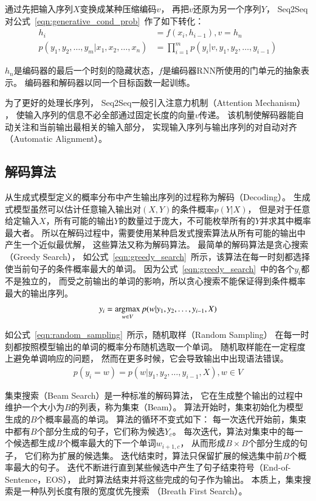 通过先把输入序列$X$变换成某种压缩编码$v$，
再把$v$还原为另一个序列$Y$，
Seq2Seq对公式~\ref{eqn:generative_cond_prob}~作了如下转化：
\begin{align}
    h_i &= f(x_i ,h_{i-1}), v = h_n \\
    p(y_1, y_2, \dots, y_m|x_1, x_2, \dots, x_n) &=
    \prod_{i=1}^m p(y_i|v, y_1, y_2, \dots, y_{i-1})
\end{align}

$h_n$是编码器的最后一个时刻的隐藏状态，$f$是编码器RNN所使用的门单元的抽象表示。
编码器和解码器以同一个目标函数一起训练。

为了更好的处理长序列，
Seq2Seq一般引入注意力机制（Attention Mechanism）
，
使输入序列的信息不必全部通过固定长度的向量$v$传递。
该机制使解码器能自动关注和当前输出最相关的输入部分，
实现输入序列与输出序列的对自动对齐（Automatic Alignment）。

\subsection{解码算法}\label{subsec:decode}
从生成式模型定义的概率分布中产生输出序列的过程称为解码（Decoding）。
生成式模型虽然可以估计任意输入输出对$(X, Y)$的条件概率$p(Y|X)$，
但是对于任意给定输入$X$，所有可能的输出$Y$的数量过于庞大，不可能枚举所有的$Y$并求其中概率最大者。
所以在解码过程中，需要使用某种启发式搜索算法从所有可能的输出中产生一个近似最优解，
这些算法又称为解码算法。
最简单的解码算法是贪心搜索（Greedy Search），
如公式~\ref{eqn:greedy_search}~所示，该算法在每一时刻都选择使当前句子的条件概率最大的单词。
因为公式~\ref{eqn:greedy_search}~中的各个$y_i$都不是独立的，
而受之前输出的单词的影响，所以贪心搜索不能保证得到条件概率最大的输出序列。
\begin{align}
    y_i = \operatorname*{argmax}_{w \in V} p(w|y_1, y_2, \dots, y_{i-1}, X)
    \label{eqn:greedy_search}
\end{align}

如公式~\ref{eqn:random_sampling}~所示，随机取样（Random Sampling）
在每一时刻都按照模型输出的单词的概率分布随机选取一个单词。
随机取样能在一定程度上避免单调响应的问题，
然而在更多时候，它会导致输出中出现语法错误。
\begin{align}
    p(y_i = w) = p(w|y_1, y_2, \dots, y_{i-1}, X), w \in V
    \label{eqn:random_sampling}
\end{align}

集束搜索（Beam Search）是一种标准的解码算法，
它在生成整个输出的过程中维护一个大小为$B$的列表，称为集束（Beam）。
算法开始时，集束初始化为模型生成的$B$个概率最高的单词。
算法的循环不变式如下：
每一次迭代开始前，集束中都有$B$个部分生成的句子，它们称为候选$Y_c$。
每次迭代，算法对集束中的每一个候选都生成$B$个概率最大的下一个单词$w_{i+1, c}$，
从而形成$B \times B$个部分生成的句子，
它们称为扩展的候选集。
迭代结束时，算法只保留扩展的候选集中前$B$个概率最大的句子。
迭代不断进行直到某些候选中产生了句子结束符号（End-of-Sentence，EOS），
此时算法结束并将这些完成的句子作为输出。
本质上，集束搜索是一种队列长度有限的宽度优先搜索
（Breath First Search）。


